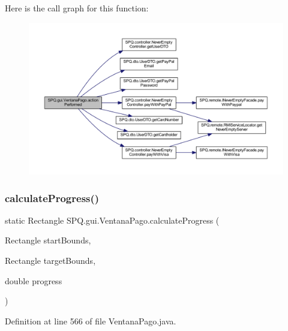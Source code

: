 Here is the call graph for this function\+:
\nopagebreak
\begin{figure}[H]
\begin{center}
\leavevmode
\includegraphics[width=350pt]{class_s_p_q_1_1gui_1_1_ventana_pago_a64947ae1b81ff8e561792d9db382b1f9_cgraph}
\end{center}
\end{figure}
\mbox{\label{class_s_p_q_1_1gui_1_1_ventana_pago_ab3583b9bfd461ce0bede2df8ea8c7bd1}} 
\subsubsection{\texorpdfstring{calculate\+Progress()}{calculateProgress()}\hspace{0.1cm}{\footnotesize\ttfamily [1/4]}}
{\footnotesize\ttfamily static Rectangle S\+P\+Q.\+gui.\+Ventana\+Pago.\+calculate\+Progress (\begin{DoxyParamCaption}\item[{Rectangle}]{start\+Bounds,  }\item[{Rectangle}]{target\+Bounds,  }\item[{double}]{progress }\end{DoxyParamCaption})\hspace{0.3cm}{\ttfamily [static]}}



Definition at line 566 of file Ventana\+Pago.\+java.

